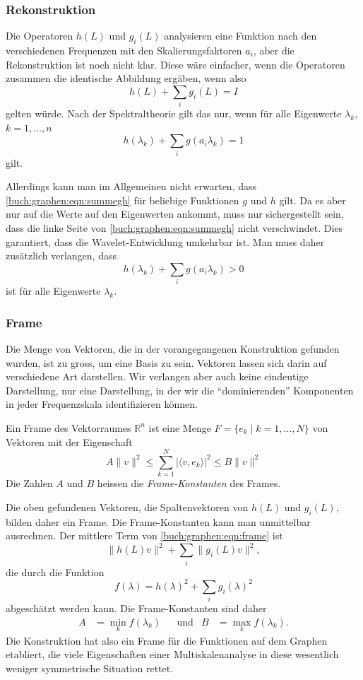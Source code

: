 \subsubsection{Rekonstruktion}
Die Operatoren $h(L)$ und $g_i(L)$ analysieren eine Funktion
nach den verschiedenen Frequenzen mit den Skalierungsfaktoren $a_i$,
aber die Rekonstruktion ist noch nicht klar.
Diese wäre einfacher, wenn die Operatoren zusammen die identische
Abbildung ergäben, wenn also
\[
h(L) + \sum_{i}g_i(L)=I
\]
gelten würde.
Nach der Spektraltheorie gilt das nur, wenn für alle Eigenwerte
$\lambda_k$, $k=1,\dots,n$
\begin{equation}
h(\lambda_k) + \sum_ig(a_i\lambda_k)=1
\label{buch:graphen:eqn:summegh}
\end{equation}
gilt.

Allerdings kann man im Allgemeinen nicht erwarten,
dass \ref{buch:graphen:eqn:summegh} für
beliebige Funktionen $g$ und $h$ gilt.
Da es aber nur auf die Werte auf den Eigenwerten ankommt,
muss nur sichergestellt sein, dass 
die linke Seite von \eqref{buch:graphen:eqn:summegh}
nicht verschwindet.
Dies garantiert, dass die Wavelet-Entwicklung umkehrbar ist.
Man muss daher zusätzlich verlangen, dass
\[
h(\lambda_k) + \sum_{i} g(a_i\lambda_k) > 0
\]
ist für alle Eigenwerte $\lambda_k$.

\subsubsection{Frame}
Die Menge von Vektoren, die in der vorangegangenen Konstruktion gefunden
wurden, ist zu gross, um eine Basis zu sein.
Vektoren lassen sich darin auf verschiedene Art darstellen.
Wir verlangen aber auch keine eindeutige Darstellung, nur eine 
Darstellung, in der wir die ``dominierenden'' Komponenten in jeder
Frequenzskala identifizieren können.

\begin{definition}
\label{buch:graphen:def:frame}
Ein Frame des Vektorraumes $\mathbb{R}^n$ ist eine Menge
$F=\{e_k\;|\; k=1,\dots,N\}$ von Vektoren mit der Eigenschaft
\begin{equation}
A\|v\|^2
\le
\sum_{k=1}^N  |\langle v,e_k\rangle|^2
\le
B\|v\|^2
\label{buch:graphen:eqn:frame}
\end{equation}
Die Zahlen $A$  und $B$ heissen die {\em Frame-Konstanten} des Frames.
\end{definition}

Die oben gefundenen Vektoren, die Spaltenvektoren von $h(L)$ und $g_i(L)$,
bilden daher ein Frame.
Die Frame-Konstanten kann man unmittelbar ausrechnen.
Der mittlere Term von \eqref{buch:graphen:eqn:frame} ist 
\[
\|h(L) v\|^2
+
\sum_{i} \|g_i(L)v\|^2,
\]
die durch die Funktion
\[
f(\lambda)
=
h(\lambda)^2 + \sum_i g_i(\lambda)^2
\]
abgeschätzt werden kann.
Die Frame-Konstanten sind daher
\[
\begin{aligned}
A&=\min_{k} f(\lambda_k)
&
&\text{und}&
B&=\max_{k} f(\lambda_k).
\end{aligned}
\]
Die Konstruktion hat also ein Frame für die Funktionen auf dem Graphen
etabliert, die viele Eigenschaften einer Multiskalenanalyse in diese
wesentlich weniger symmetrische Situation rettet.




